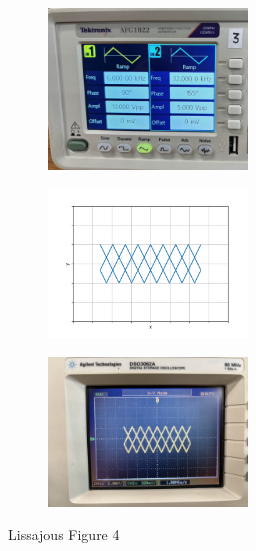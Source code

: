 \documentclass[a4paper,12pt]{article}
\begin{document}
\begin{figure}[h!]
	\begin{subfigure}[b]{10pt}
		\includegraphics[width = 150pt]{figs/fig4.jpeg}
	\end{subfigure}
	\hspace{120pt}
	\begin{subfigure}[b]{10pt}
		\includegraphics[width = 150pt]{figs/fig4.png}
	\end{subfigure}
	\hspace{130pt}
	\begin{subfigure}[b]{10pt}
		\includegraphics[width = 150pt]{figs/fig4_1.jpeg}
	\end{subfigure}
	\caption{Lissajous Figure 4}
\end{figure}
\pagebreak
\end{document}
